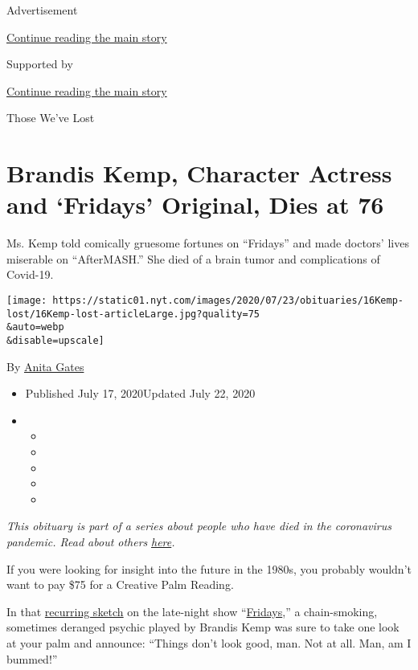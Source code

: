 Advertisement

\protect\hyperlink{after-top}{Continue reading the main story}

Supported by

\protect\hyperlink{after-sponsor}{Continue reading the main story}

Those We've Lost

\hypertarget{brandis-kemp-character-actress-and-fridays-original-dies-at-76}{%
\section{Brandis Kemp, Character Actress and `Fridays' Original, Dies at
76}\label{brandis-kemp-character-actress-and-fridays-original-dies-at-76}}

Ms. Kemp told comically gruesome fortunes on ``Fridays'' and made
doctors' lives miserable on ``AfterMASH.'' She died of a brain tumor and
complications of Covid-19.

\texttt{[image: https://static01.nyt.com/images/2020/07/23/obituaries/16Kemp-lost/16Kemp-lost-articleLarge.jpg?quality=75\\\&auto=webp\\\&disable=upscale]}

By \href{https://www.nytimes.com/by/anita-gates}{Anita Gates}

\begin{itemize}
\item
  Published July 17, 2020Updated July 22, 2020
\item
  \begin{itemize}
  \item
  \item
  \item
  \item
  \item
  \end{itemize}
\end{itemize}

\emph{This obituary is part of a series about people who have died in
the coronavirus pandemic. Read about others}
\href{https://www.nytimes.com/interactive/2020/obituaries/people-died-coronavirus-obituaries.html}{\emph{here}}\emph{.}

If you were looking for insight into the future in the 1980s, you
probably wouldn't want to pay \$75 for a Creative Palm Reading.

In that \href{https://www.youtube.com/watch?v=AzWfAdgnMXw}{recurring
sketch} on the late-night show
``\href{https://www.vulture.com/2012/01/fridays-the-snl-ripoff-that-nearly-surpassed-the-original.html}{Fridays},''
a chain-smoking, sometimes deranged psychic played by Brandis Kemp was
sure to take one look at your palm and announce: ``Things don't look
good, man. Not at all. Man, am I bummed!''

